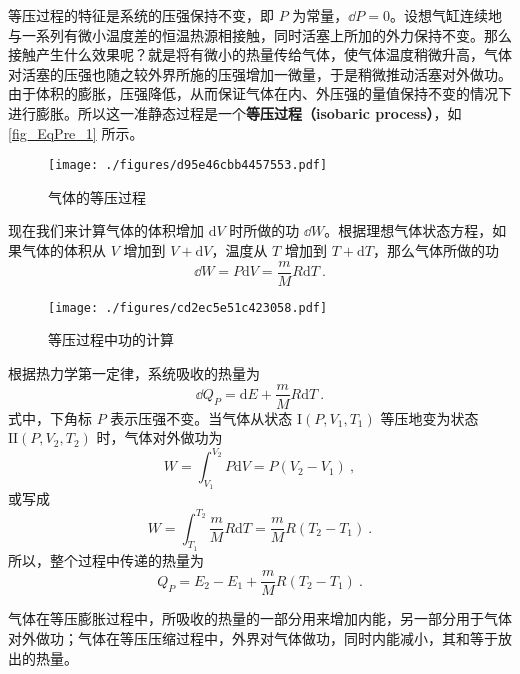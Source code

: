 

等压过程的特征是系统的压强保持不变，即 $P$ 为常量，$\dd P =0$。设想气缸连续地与一系列有微小温度差的恒温热源相接触，同时活塞上所加的外力保持不变。那么接触产生什么效果呢？就是将有微小的热量传给气体，使气体温度稍微升高，气体对活塞的压强也随之较外界所施的压强增加一微量，于是稍微推动活塞对外做功。由于体积的膨胀，压强降低，从而保证气体在内、外压强的量值保持不变的情况下进行膨胀。所以这一准静态过程是一个\textbf{等压过程（isobaric process）}，如\autoref{fig_EqPre_1} 所示。
\begin{figure}[ht]
\centering
\texttt{[image: ./figures/d95e46cbb4457553.pdf]}
\caption{气体的等压过程} \label{fig_EqPre_1}
\end{figure}
现在我们来计算气体的体积增加 $\mathrm d V $ 时所做的功 $\dd W$。根据理想气体状态方程，如果气体的体积从 $V $ 增加到 $V+\mathrm dV$，温度从 $T $ 增加到 $T+\mathrm dT$，那么气体所做的功
\begin{equation}
\dd W=P \mathrm{d} V=\frac{m}{M} R \mathrm{d} T~.
\end{equation}
\begin{figure}[ht]
\centering
\texttt{[image: ./figures/cd2ec5e51c423058.pdf]}
\caption{等压过程中功的计算} \label{fig_EqPre_2}
\end{figure}
根据热力学第一定律，系统吸收的热量为
\begin{equation}
\dd Q_{P}=\mathrm{d} E+\frac{m}{M} R \mathrm{d} T~.
\end{equation}
式中，下角标 $P$ 表示压强不变。当气体从状态 $\mathrm I(P, V_1, T_1)$ 等压地变为状态 $\mathrm{II}(P, V_2,T_2)$ 时，气体对外做功为
\begin{equation}
W=\int_{V_{1}}^{V_{2}} P \mathrm{d} V=P\left(V_{2}-V_{1}\right)~,
\end{equation}
或写成
\begin{equation}
W=\int_{T_{1}}^{T_{2}} \frac{m}{M} R \mathrm{d} T=\frac{m}{M} R\left(T_{2}-T_{1}\right)~.
\end{equation}
所以，整个过程中传递的热量为
\begin{equation}
Q_{P}=E_{2}-E_{1}+\frac{m}{M} R\left(T_{2}-T_{1}\right)~.
\end{equation}

气体在等压膨胀过程中，所吸收的热量的一部分用来增加内能，另一部分用于气体对外做功；气体在等压压缩过程中，外界对气体做功，同时内能减小，其和等于放出的热量。

